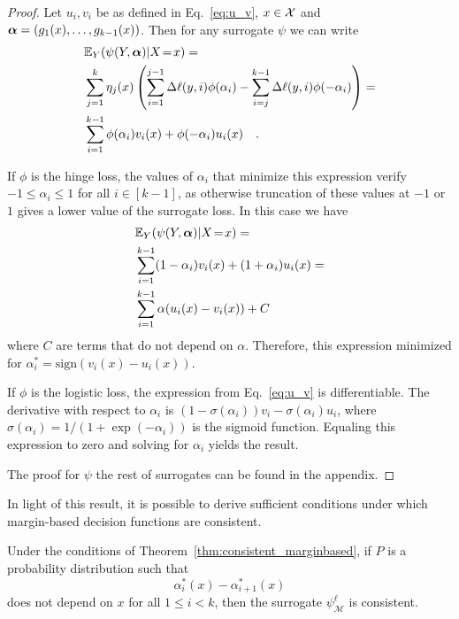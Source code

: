 \begin{proof}
Let $u_i, v_i$ be as defined in Eq.~\eqref{eq:u_v}, $x \in \mathcal{X}$ and $\boldsymbol \alpha = (g_1(x), \ldots, g_{k-1}(x))$. Then for any surrogate $\psi$ we can write
\begin{equation}
\begin{aligned}
&\mathbb{E}_Y(\psi(Y, \balpha) | X\!=\!x) = \\
&\sum_{j=1}^k \eta_j(x) \left(\sum_{i = 1}^{j-1} \Delta\ell(y, i) \phi(\alpha_i) - \sum_{i = j}^{k-1} \Delta\ell(y, i) \phi(-\alpha_i)\right) = \\
&\sum_{i=1}^{k-1} \phi(\alpha_i)v_i(x) + \phi(-\alpha_i)u_i(x) \quad.\\
\end{aligned}
\label{eq:expected_risk}
\end{equation}

If $\phi$ is the hinge loss, the values of $\alpha_i$ that minimize this expression verify $-1 \leq \alpha_i \leq 1$ for all $i \in [k-1]$, as otherwise truncation of these values at $-1$ or $1$ gives a lower value of the surrogate loss. In this case we have 
$$
\begin{aligned}
&\mathbb{E}_Y(\psi(Y, \boldsymbol \alpha) | X\!=\!x) = \\
&\sum_{i=1}^{k-1} (1 - \alpha_i)v_i(x) + (1 +\alpha_i)u_i(x) = \\
&\sum_{i=1}^{k-1} \alpha(u_i(x) - v_i(x)) + C
\end{aligned}
$$
where $C$ are terms that do not depend on $\alpha$.
Therefore, this expression minimized for $\alpha_i^* = \text{sign}(v_i(x) - u_i(x))$.



If $\phi$ is the logistic loss, the expression from Eq.~\eqref{eq:u_v} is differentiable. The derivative with respect to $\alpha_i$ is $(1 - \sigma(\alpha_i)) v_i - \sigma(\alpha_i) u_i $, where $\sigma(\alpha_i) = 1/(1 + \exp(-\alpha_i))$ is the sigmoid function. Equaling this expression to zero and solving for $\alpha_i$ yields the result.

The proof for $\psi$ the rest of surrogates can be found in the appendix.
\end{proof}

In light of this result, it is possible to derive sufficient conditions under which margin-based decision functions are consistent.

\begin{corollary}\label{cor:consistent_marginbased}
Under the conditions of Theorem~\ref{thm:consistent_marginbased}, if $P$ is a probability distribution such that
$$
\alpha^*_i(x) - \alpha^*_{i+1}(x)
$$
does not depend on $x$ for all $1 \leq i < k$, then the surrogate $\psi_{\mathcal{M}}^\ell$ is consistent.
\end{corollary}

